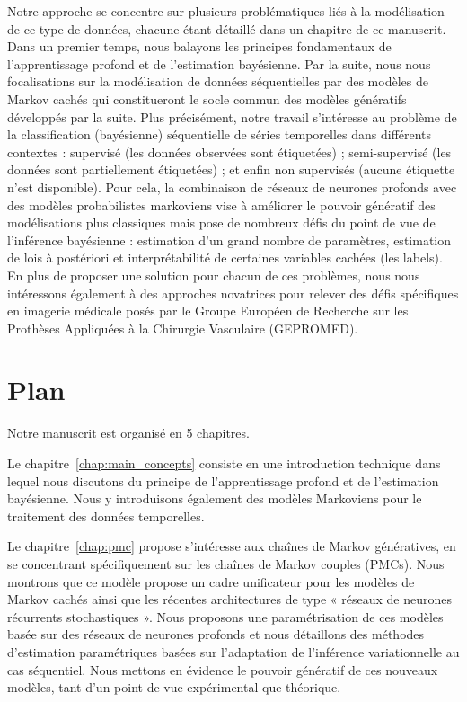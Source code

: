 Notre approche se concentre sur plusieurs problématiques liés à la modélisation
de ce type de données, chacune étant détaillé dans un chapitre de ce manuscrit.
Dans un premier temps, nous balayons les principes fondamentaux de
l'apprentissage profond et de l'estimation bayésienne. Par la suite, nous nous
focalisations sur la modélisation de données séquentielles par des modèles de
Markov cachés qui constitueront le socle commun des modèles génératifs
développés par la suite. Plus précisément, notre travail s'intéresse au problème
de la classification (bayésienne) séquentielle de séries temporelles dans
différents contextes : supervisé (les données observées sont étiquetées) ;
semi-supervisé (les données sont partiellement étiquetées) ; et enfin non
supervisés (aucune étiquette n'est disponible). Pour cela, la combinaison de
réseaux de neurones profonds avec des modèles probabilistes markoviens vise à
améliorer le pouvoir génératif des modélisations plus classiques mais pose de
nombreux défis du point de vue de l'inférence bayésienne : estimation d'un grand
nombre de paramètres, estimation de lois à postériori et interprétabilité de
certaines variables cachées (les labels). En plus de proposer une solution pour
chacun de ces problèmes, nous nous intéressons également à des approches
novatrices pour relever des défis spécifiques en imagerie médicale posés par le
Groupe Européen de Recherche sur les Prothèses Appliquées à la Chirurgie
Vasculaire (GEPROMED).\\


\vspace{.20cm}
\section*{Plan}
Notre manuscrit est organisé en 5 chapitres. 

Le chapitre~\ref{chap:main_concepts} 
consiste en une introduction technique dans lequel nous discutons du principe de
l'apprentissage profond et de l'estimation bayésienne. Nous y introduisons
également des modèles Markoviens pour le traitement des données temporelles.

Le chapitre~\ref{chap:pmc} 
propose s’intéresse aux chaînes de Markov génératives,
en se concentrant spécifiquement sur les chaînes de Markov couples (PMCs). 
Nous montrons que ce modèle propose un cadre unificateur pour les modèles de
Markov cachés ainsi que les récentes architectures de type « réseaux de neurones
récurrents stochastiques ». Nous proposons une paramétrisation de ces modèles
basée sur des réseaux de neurones profonds et nous détaillons des méthodes
d'estimation paramétriques basées sur l'adaptation de l'inférence variationnelle
au cas séquentiel. Nous mettons en évidence le pouvoir génératif de ces nouveaux
modèles, tant d'un point de vue expérimental que théorique.

